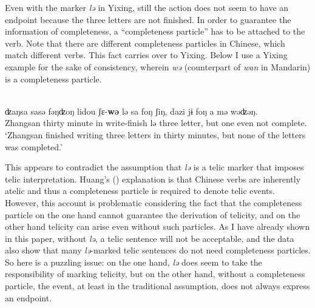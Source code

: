 \documentclass[output=paper]{langsci/langscibook}
\begin{document}
Even with the marker \emph{lə} in Yixing, still the action
does not seem to have an endpoint because the three letters are not finished.
In order to guarantee the information of completeness, a ``completeness
particle'' has to be attached to the verb. Note that there are different
completeness particles in Chinese, which match different verbs. This fact
carries over to Yixing. Below I use a Yixing example for the sake of
consistency, wherein \emph{wə} (counterpart of \emph{wan} in Mandarin) is a
completeness particle.

\begin{exe}
    \ex\label{*completeness} \\
    \gll ʣaŋsa {sasə} {fəŋʣoŋ} lidou {ʃε-\textbf{wə}} {lə} sa {foŋ} {ʃiŋ},
    \llap{*}dazi {jɨ} {foŋ} a {mə} wəʣəŋ. \\
    Zhangsan thirty minute in write-finish {lə} three \Clf{} letter, but one \Clf{} even not complete. \\
    \glt \enquote*{Zhangsan finished writing three letters in thirty minutes,
    but none of the letters was completed.}\footnotemark
\end{exe}

This appears to contradict the assumption that \emph{lə} is a telic marker that
imposes telic interpretation. Huang's (\citeyear{huang2015syntactic})
explanation is that Chinese verbs are inherently atelic and thus a completeness
particle is required to denote telic events. However, this account is
problematic considering the fact that the completeness particle on the one hand
cannot guarantee the derivation of telicity, and on the other hand telicity can
arise even without such particles. As I have already shown in this paper,
without \emph{lə}, a telic sentence will not be acceptable, and the data also
show that many \emph{lə}-marked telic sentences do not need completeness
particles. So here is a puzzling issue: on the one hand, \emph{lə} does seem to
take the responsibility of marking telicity, but on the other hand, without a
completeness particle, the event, at least in the traditional assumption, does
not always express an endpoint.
\end{document}
